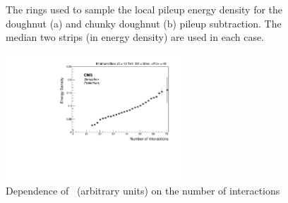 \begin{figure}
\hfill
{}
\hfill
{}
\hfill
\caption{The rings used to sample the local pileup energy density for the doughnut (a) and chunky doughnut (b)
pileup subtraction. The median two strips (in energy density) are used in each case.}
\end{figure}

\begin{figure}
\centering
    \includegraphics[width=0.6\textwidth]{./Figures/triggerUpgrade/threestrips}
  \caption{Dependence of \rhoC~(arbitrary units) on the number of interactions}
  \label{fig:threestripNint}
\end{figure}  

